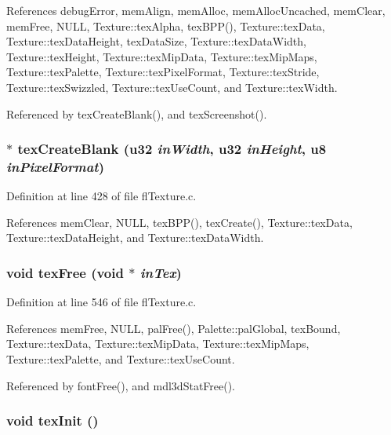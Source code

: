 References debug\-Error, mem\-Align, mem\-Alloc, mem\-Alloc\-Uncached, mem\-Clear, mem\-Free, NULL, Texture::tex\-Alpha, tex\-BPP(), Texture::tex\-Data, Texture::tex\-Data\-Height, tex\-Data\-Size, Texture::tex\-Data\-Width, Texture::tex\-Height, Texture::tex\-Mip\-Data, Texture::tex\-Mip\-Maps, Texture::tex\-Palette, Texture::tex\-Pixel\-Format, Texture::tex\-Stride, Texture::tex\-Swizzled, Texture::tex\-Use\-Count, and Texture::tex\-Width.

Referenced by tex\-Create\-Blank(), and tex\-Screenshot().
\subsubsection{$\ast$ tex\-Create\-Blank (u32 {\em in\-Width}, u32 {\em in\-Height}, u8 {\em in\-Pixel\-Format})}\label{flTexture_8c_6e73ae11c73736849b72913fa3835bf0}




Definition at line 428 of file fl\-Texture.c.

References mem\-Clear, NULL, tex\-BPP(), tex\-Create(), Texture::tex\-Data, Texture::tex\-Data\-Height, and Texture::tex\-Data\-Width.
\subsubsection{\setlength{\rightskip}{0pt plus 5cm}void tex\-Free (void $\ast$ {\em in\-Tex})}\label{flTexture_8c_8fb8e4b38a9296ed9af008419170efee}




Definition at line 546 of file fl\-Texture.c.

References mem\-Free, NULL, pal\-Free(), Palette::pal\-Global, tex\-Bound, Texture::tex\-Data, Texture::tex\-Mip\-Data, Texture::tex\-Mip\-Maps, Texture::tex\-Palette, and Texture::tex\-Use\-Count.

Referenced by font\-Free(), and mdl3d\-Stat\-Free().
\subsubsection{\setlength{\rightskip}{0pt plus 5cm}void tex\-Init ()}\label{flTexture_8c_d71c7b4ba0396ef491df47e51dd55235}




